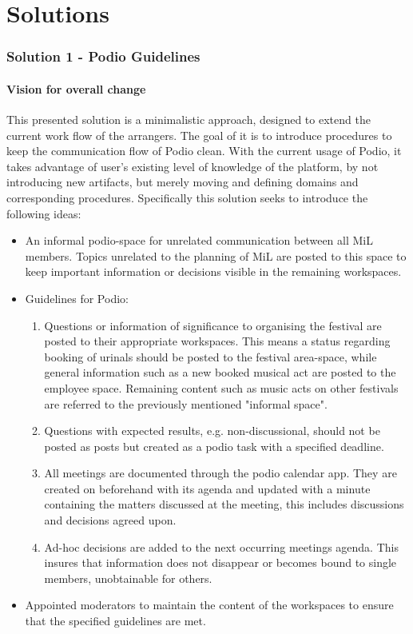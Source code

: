\part{Solutions}
\section{Solution 1 - Podio Guidelines}

\subsection{Vision for overall change} 
This presented solution is a minimalistic approach, designed to extend the current work flow of the
arrangers. The goal of it is to introduce procedures to keep the communication flow of Podio clean.
With the current usage of Podio, it takes advantage of user's existing level of knowledge of the
platform, by not introducing new artifacts, but merely moving and defining domains and corresponding procedures. Specifically this solution seeks to introduce the following ideas:

\begin{itemize}
    \item An informal podio-space for unrelated communication between all MiL members. Topics unrelated to the planning of MiL are posted to this space to keep important information or decisions visible in the remaining workspaces.
    \item Guidelines for Podio:
    \begin{enumerate}
        \item Questions or information of significance to organising the festival are posted to
        their appropriate workspaces. This means a status regarding booking of urinals should be
        posted to the festival area-space, while general information such as a new booked musical
        act are posted to the employee space. Remaining content such as music acts on other
        festivals are referred to the previously mentioned "informal space".
        \item Questions with expected results, e.g. non-discussional, should not be posted as posts but created as a podio task with a specified deadline. 
        \item All meetings are documented through the podio calendar app. They are created on
        beforehand with its agenda and updated with a minute containing the matters discussed at the
        meeting, this includes discussions and decisions agreed upon.
        \item Ad-hoc decisions are added to the next occurring meetings agenda. This insures that
        information does not disappear or becomes bound to single members, unobtainable for others.
    \end{enumerate}
    \item Appointed moderators to maintain the content of the workspaces to ensure that the specified guidelines are met.
\end{itemize}

